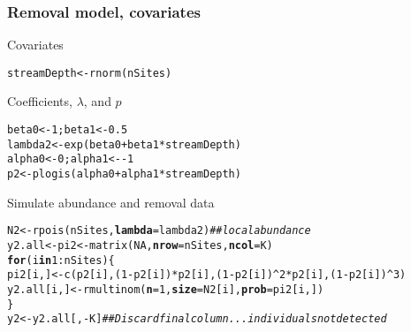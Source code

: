\documentclass[color=usenames,dvipsnames]{beamer}\usepackage[]{graphicx}\usepackage[]{xcolor}
\makeatletter
\newcommand{\hlnum}[1]{\textcolor[rgb]{0.69,0.494,0}{#1}}%
\newcommand{\hlcom}[1]{\textcolor[rgb]{0.514,0.506,0.514}{\textit{#1}}}%
\newcommand{\hlopt}[1]{\textcolor[rgb]{0,0,0}{#1}}%
\newcommand{\hlstd}[1]{\textcolor[rgb]{0,0,0}{#1}}%
\newcommand{\hlkwa}[1]{\textcolor[rgb]{0,0,0}{\textbf{#1}}}%
\newcommand{\hlkwb}[1]{\textcolor[rgb]{0,0.341,0.682}{#1}}%
\newcommand{\hlkwc}[1]{\textcolor[rgb]{0,0,0}{\textbf{#1}}}%
\newcommand{\hlkwd}[1]{\textcolor[rgb]{0.004,0.004,0.506}{#1}}%
\newenvironment{kframe}{%
 \def\at@end@of@kframe{}%
 \ifinner\ifhmode%
  \def\at@end@of@kframe{\end{minipage}}%
  \begin{minipage}{\columnwidth}%
 \fi\fi%
 \def\FrameCommand##1{\hskip\@totalleftmargin \hskip-\fboxsep
 \colorbox{shadecolor}{##1}\hskip-\fboxsep
     \hskip-\linewidth \hskip-\@totalleftmargin \hskip\columnwidth}%
 \MakeFramed {\advance\hsize-\width
   \@totalleftmargin\z@ \linewidth\hsize
   \@setminipage}}%
 {\par\unskip\endMakeFramed%
 \at@end@of@kframe}
\newenvironment{knitrout}{}{} %
\makeatother
\begin{document}
\begin{frame}[fragile]
  \frametitle{Removal model, covariates}
  \small
  Covariates
  \vspace{-6pt}
\begin{knitrout}\scriptsize
{}\color{fgcolor}\begin{kframe}
\begin{alltt}
\hlstd{streamDepth} \hlkwb{<-} \hlkwd{rnorm}\hlstd{(nSites)}
\end{alltt}
\end{kframe}
\end{knitrout}
\vfill
  Coefficients, $\lambda$, and $p$
  \vspace{-6pt}
\begin{knitrout}\scriptsize
{}\color{fgcolor}\begin{kframe}
\begin{alltt}
\hlstd{beta0} \hlkwb{<-} \hlnum{1}\hlstd{; beta1} \hlkwb{<-} \hlnum{0.5}
\hlstd{lambda2} \hlkwb{<-} \hlkwd{exp}\hlstd{(beta0} \hlopt{+} \hlstd{beta1}\hlopt{*}\hlstd{streamDepth)}
\hlstd{alpha0} \hlkwb{<-} \hlnum{0}\hlstd{; alpha1} \hlkwb{<-} \hlopt{-}\hlnum{1}
\hlstd{p2} \hlkwb{<-} \hlkwd{plogis}\hlstd{(alpha0} \hlopt{+} \hlstd{alpha1}\hlopt{*}\hlstd{streamDepth)}
\end{alltt}
\end{kframe}
\end{knitrout}
\vfill
  Simulate abundance and removal data
  \vspace{-6pt}
\begin{knitrout}\scriptsize
{}\color{fgcolor}\begin{kframe}
\begin{alltt}
\hlstd{N2} \hlkwb{<-} \hlkwd{rpois}\hlstd{(nSites,} \hlkwc{lambda}\hlstd{=lambda2)}         \hlcom{## local abundance }
\hlstd{y2.all} \hlkwb{<-} \hlstd{pi2} \hlkwb{<-} \hlkwd{matrix}\hlstd{(}\hlnum{NA}\hlstd{,} \hlkwc{nrow}\hlstd{=nSites,} \hlkwc{ncol}\hlstd{=K)}
\hlkwa{for}\hlstd{(i} \hlkwa{in} \hlnum{1}\hlopt{:}\hlstd{nSites) \{}
    \hlstd{pi2[i,]} \hlkwb{<-} \hlkwd{c}\hlstd{(p2[i], (}\hlnum{1}\hlopt{-}\hlstd{p2[i])}\hlopt{*}\hlstd{p2[i], (}\hlnum{1}\hlopt{-}\hlstd{p2[i])}\hlopt{^}\hlnum{2}\hlopt{*}\hlstd{p2[i], (}\hlnum{1}\hlopt{-}\hlstd{p2[i])}\hlopt{^}\hlnum{3}\hlstd{)}
    \hlstd{y2.all[i,]} \hlkwb{<-} \hlkwd{rmultinom}\hlstd{(}\hlkwc{n}\hlstd{=}\hlnum{1}\hlstd{,} \hlkwc{size}\hlstd{=N2[i],} \hlkwc{prob}\hlstd{=pi2[i,])}
\hlstd{\}}
\hlstd{y2} \hlkwb{<-} \hlstd{y2.all[,}\hlopt{-}\hlstd{K]} \hlcom{## Discard final column... individuals not detected}
\end{alltt}
\end{kframe}
\end{knitrout}
\end{frame}
\end{document}
